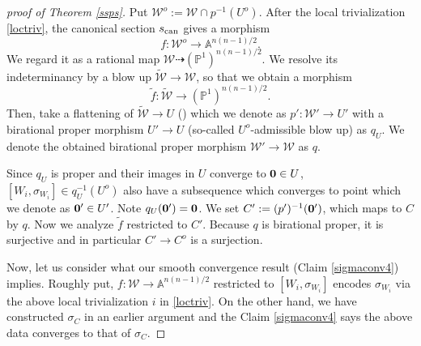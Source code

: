 \documentclass[12pt,a4paper]{amsart}
\theoremstyle{remark}
\theoremstyle{definition}
\def\P{\mathbb{P}}
\def\A{\mathbb{A}}
\begin{document}
\begin{proof}[proof of Theorem \ref{ssps}]
Put $\mathcal{W}^o:=\mathcal{W}\cap p^{-1}(U^o)$. 
After the local trivialization \eqref{loctriv}, the canonical 
section $s_{\rm can}$ gives a morphism 
$$f\colon \mathcal{W}^o \to \A^{n(n-1)/2}.$$ 
We regard it as a rational map 
$\mathcal{W}\dashrightarrow (\mathbb{P}^1)^{n(n-1)/2}$.  
We resolve its indeterminancy by a blow up 
$\widetilde{\mathcal{W}}\to \mathcal{W}$,  
so that we obtain a morphism 
$$\tilde{f}\colon \widetilde{\mathcal{W}}\to (\P^1)^{n(n-1)/2}.$$
Then, take a 
flattening of $\widetilde{\mathcal{W}}\to U$ (\cite[5.2.2]{RG}) 
which we denote as $p'\colon \mathcal{W}'\to U'$ 
with a birational proper morphism 
$U'\to U$ (so-called $U^o$-admissible blow up) as $q_U$. 
We denote the obtained 
birational proper morphism $\mathcal{W}'\to 
\mathcal{W}$ as $q$. 

Since $q_U$ is proper and their images in $U$ 
converge to ${\bf 0}\in U$, $[W_i, \sigma_{W_i}]\in q_U^{-1}(U^o)$ also have a subsequence which 
converges to point which we denote as ${\bf 0}'\in U'$. 
Note $q_U({\bf 0}')={\bf 0}$. 
We set $C':=(p')^{-1}({\bf 0}')$, which maps to $C$ 
by $q$. 
Now we analyze $\tilde{f}$ restricted to $C'$. 
Because $q$ is birational proper, it is surjective and in 
particular $C'\to C^o$ is a surjection. 

Now, let us consider what our smooth convergence result 
(Claim \eqref{sigmaconv4}) implies. Roughly put, 
$f\colon \mathcal{W}\to \A^{n(n-1)/2}$
restricted to $[W_i,\sigma_{W_i}]$ encodes $\sigma_{W_i}$ 
via the above local trivialization $i$ in \eqref{loctriv}. 
On the other hand, 
we have constructed $\sigma_C$ in an earlier argument 
and the Claim \eqref{sigmaconv4} says 
the above data converges to that of $\sigma_C$. 


\end{proof}
\end{document}
